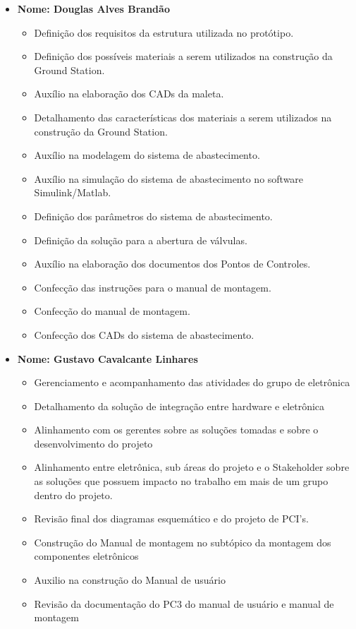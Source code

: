 \begin{itemize}
    
    \item \textbf{Nome: Douglas Alves Brandão}
    \begin{itemize}
         \item Definição dos requisitos da estrutura utilizada no protótipo.
         \item Definição dos possíveis materiais a serem utilizados na construção da Ground Station.
         \item Auxílio na elaboração dos CADs da maleta. 
         \item Detalhamento das características dos materiais a serem utilizados na construção da Ground Station.
         \item Auxílio na modelagem do sistema de abastecimento. 
         \item Auxílio na simulação do sistema de abastecimento no software Simulink/Matlab.
         \item Definição dos parâmetros do sistema de abastecimento.
        \item Definição da solução para a abertura de válvulas.
         \item Auxílio na elaboração dos documentos dos Pontos de Controles.
         \item Confecção das instruções para o manual de montagem.
        \item Confecção do manual de montagem.
        \item Confecção dos CADs do sistema de abastecimento.
    \end{itemize}


    \item \textbf{Nome: Gustavo Cavalcante Linhares}
    \begin{itemize}
         \item Gerenciamento e acompanhamento das atividades do grupo de eletrônica 
         \item Detalhamento da solução de integração entre hardware e eletrônica
         \item Alinhamento com os gerentes sobre as soluções tomadas e sobre o desenvolvimento do projeto
         \item Alinhamento entre eletrônica, sub áreas do projeto e o Stakeholder sobre as soluções que possuem impacto no trabalho em mais de um grupo dentro do projeto.
         \item Revisão final dos diagramas esquemático e do projeto de PCI's.
         \item Construção do Manual de montagem no subtópico da montagem dos componentes eletrônicos 
         \item Auxilio na construção do Manual de usuário
         \item Revisão da documentação do PC3 do manual de usuário e manual de montagem
    \end{itemize}
    

\end{itemize}

